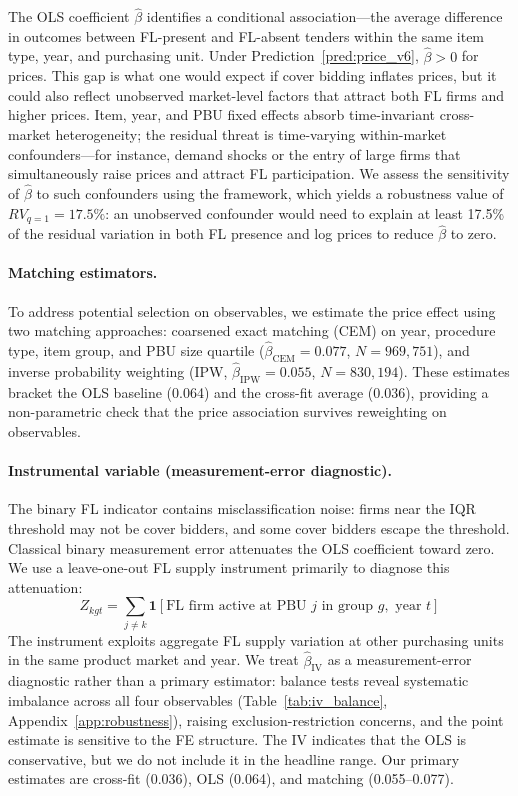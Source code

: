 The OLS coefficient $\hat{\beta}$ identifies a conditional
association---the average difference in outcomes between FL-present and
FL-absent tenders within the same item type, year, and purchasing unit.
Under Prediction~\ref{pred:price_v6}, $\hat{\beta} > 0$ for prices.
This gap is what one would expect if cover bidding inflates prices, but
it could also reflect unobserved market-level factors that attract both
FL firms and higher prices. Item, year, and PBU fixed effects absorb
time-invariant cross-market heterogeneity; the residual threat is time-varying within-market confounders---for
instance, demand shocks or the entry of large firms that
simultaneously raise prices and attract FL participation. We assess the sensitivity of
$\hat{\beta}$ to such confounders using the \citet{cinelli2020making}
framework, which yields a robustness value of $RV_{q=1} = 17.5\%$: an
unobserved confounder would need to explain at least 17.5\% of the
residual variation in both FL presence and log prices to reduce
$\hat{\beta}$ to zero.

\paragraph{Matching estimators.}
To address potential selection on observables, we estimate the
price effect using two matching approaches: coarsened exact
matching (CEM) on year, procedure type, item group, and PBU size
quartile ($\hat{\beta}_{\text{CEM}} = 0.077$, $N = 969{,}751$), and
inverse probability weighting (IPW, $\hat{\beta}_{\text{IPW}} = 0.055$,
$N = 830{,}194$). These estimates bracket the OLS baseline (0.064)
and the cross-fit average (0.036), providing a non-parametric check
that the price association survives reweighting on observables.

\paragraph{Instrumental variable (measurement-error diagnostic).}
The binary FL indicator contains misclassification noise: firms near
the IQR threshold may not be cover bidders, and some cover bidders
escape the threshold. Classical binary measurement error attenuates
the OLS coefficient toward zero. We use a leave-one-out FL supply
instrument primarily to diagnose this attenuation:
\begin{equation}
  Z_{kgt} = \sum_{j \neq k} \mathbf{1}[\text{FL firm active at PBU } j
  \text{ in group } g, \text{ year } t]
  \label{eq:iv_v6}
\end{equation}
The instrument exploits aggregate FL supply variation at other
purchasing units in the same product market and year. We treat
$\hat{\beta}_{\text{IV}}$ as a measurement-error diagnostic rather
than a primary estimator: balance tests reveal systematic imbalance
across all four observables (Table~\ref{tab:iv_balance},
Appendix~\ref{app:robustness}), raising exclusion-restriction
concerns, and the point estimate is sensitive to the FE structure. The IV
indicates that the OLS is conservative, but we do not include it in
the headline range. Our primary estimates are cross-fit (0.036),
OLS (0.064), and matching (0.055--0.077).

